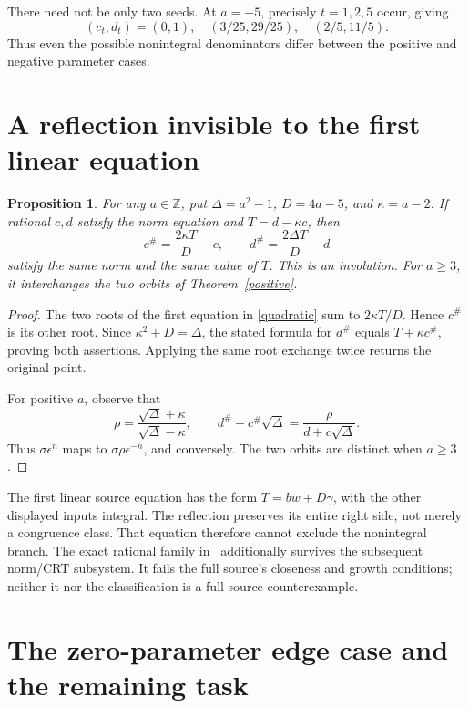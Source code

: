 \documentclass[11pt]{article}
\newtheorem{proposition}[theorem]{Proposition}
\newcommand{\Z}{\mathbb Z}\newcommand{\Q}{\mathbb Q}
\begin{document}
There need not be only two seeds. At \(a=-5\), precisely
\(t=1,2,5\) occur, giving
\[
 (c_t,d_t)=(0,1),\quad(3/25,29/25),\quad(2/5,11/5).
\]
Thus even the possible nonintegral denominators differ between the
positive and negative parameter cases.

\section{A reflection invisible to the first linear equation}

\begin{proposition}\label{reflection}
For any \(a\in\Z\), put \(\Delta=a^2-1\), \(D=4a-5\),
and \(\kappa=a-2\). If rational \(c,d\) satisfy the norm equation
and \(T=d-\kappa c\), then
\begin{equation}\label{reflection-formula}
 c^\#=\frac{2\kappa T}{D}-c,\qquad
 d^\#=\frac{2\Delta T}{D}-d
\end{equation}
satisfy the same norm and the same value of \(T\). This is an
involution. For \(a\ge3\), it interchanges the two orbits of
Theorem~\ref{positive}.
\end{proposition}
\begin{proof}
The two roots of the first equation in \eqref{quadratic} sum to
\(2\kappa T/D\). Hence \(c^\#\) is its other root. Since
\(\kappa^2+D=\Delta\), the stated formula for \(d^\#\) equals
\(T+\kappa c^\#\), proving both assertions. Applying the same root
exchange twice returns the original point.

For positive \(a\), observe that
\[
 \rho=\frac{\sqrt\Delta+\kappa}{\sqrt\Delta-\kappa},\qquad
 d^\#+c^\#\sqrt\Delta
       =\frac{\rho}{d+c\sqrt\Delta}.
\]
Thus \(\sigma\epsilon^n\) maps to
\(\sigma\rho\epsilon^{-n}\), and conversely. The two orbits
are distinct when \(a\ge3\).
\end{proof}

The first linear source equation has the form
\(T=bw+D\gamma\), with the other displayed inputs integral.
The reflection preserves its entire right side, not merely a congruence
class. That equation therefore cannot exclude the nonintegral branch.
The exact rational family in~\cite{Obstruction} additionally survives
the subsequent norm/CRT subsystem. It fails the full source's closeness
and growth conditions; neither it nor the classification is a full-source
counterexample.

\section{The zero-parameter edge case and the remaining task}
\end{document}
